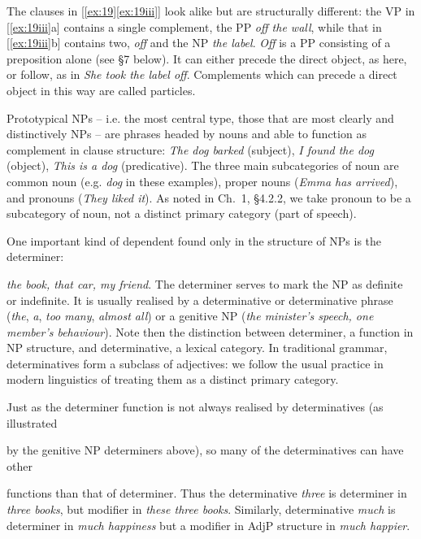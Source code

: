 The clauses in [\ref{ex:19}\ref{ex:19iii}] look alike but are structurally different: the VP in [\ref{ex:19iii}a] contains a single complement, the PP \textit{off the wall}, while that in [\ref{ex:19iii}b] contains two, \textit{off} and the NP \textit{the label}. \textit{Off} is a PP consisting of a preposition alone (see §7 below). It can either precede the direct object, as here, or follow, as in \textit{She took the label off}. Complements which can precede a direct object in this way are called {particles}.


Prototypical NPs -- i.e. the most central type, those that are most clearly and distinctively NPs -- are phrases headed by nouns and able to function as complement in clause structure: \textit{The dog barked} (subject), \textit{I found the dog} (object), \textit{This is a dog} (predicative). The three main subcategories of noun are {common noun} (e.g. \textit{dog} in these examples), {proper nouns} (\textit{Emma has arrived}), and {pronouns} (\textit{They liked it}). As noted in Ch.~1, §4.2.2, we take pronoun to be a subcategory of noun, not a distinct primary category (part of speech).

One important kind of dependent found only in the structure of NPs is the {determiner}: {\textit{the book, that car, my friend}. The determiner serves to mark the NP as definite or indefinite. It is usually realised by a determinative or determinative phrase (\textit{the}, \textit{a}, \textit{too many}, \textit{almost all}) or a genitive NP (\textit{the minister's speech, one member's behaviour}). Note then the distinction between {determiner}, a function in NP structure, and {determinative}, a lexical category. In traditional grammar, determinatives form a subclass of adjectives: we follow the usual practice in modern linguistics of treating them as a distinct primary category.

Just as the determiner function is not always realised by determinatives (as illustrated} by the genitive NP determiners above), so many of the determinatives can have other



\noindent functions than that of determiner. Thus the determinative \textit{three} is determiner in \textit{three books}, but modifier in \textit{these three books}. Similarly, determinative \textit{much} is determiner in \textit{much happiness} but a modifier in AdjP structure in \textit{much happier}.

